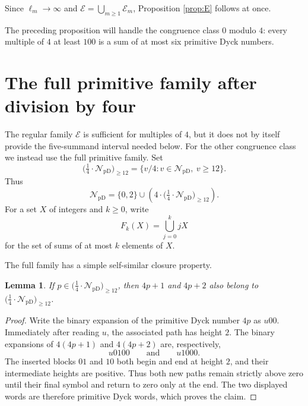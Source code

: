 \documentclass[12pt]{article}
\theoremstyle{plain}
\newtheorem{lemma}[theorem]{Lemma}
\newcommand{\NpD}{\mathcal{N}_{\mathrm{pD}}}
\newcommand{\Pset}{\bigl(\tfrac14\cdot
  \mathcal N_{\mathrm{pD}}\bigr)_{\ge 12}}
\begin{document}
Since $\ell_{m}\to\infty$ and $\mathcal E=\bigcup_{m\geq1}\mathcal E_{m}$,
Proposition \ref{prop:E} follows at once.

The preceding proposition will handle the congruence class $0$ modulo
$4$: every multiple of $4$ at least $100$ is a sum of at most six
primitive Dyck numbers.

\section{The full primitive family after division by four}

The regular family $\mathcal E$ is sufficient for multiples of $4$, but
it does not by itself provide the five-summand interval needed below.
For the other congruence class we instead use the full primitive family.
Set
\[
 \Pset=\{v/4:v\in\NpD,\ v\geq12\}.
\]
Thus
\[
 \NpD=\{0,2\}\cup(4\cdot\Pset).
\]
For a set $X$ of integers and $k\geq0$, write
\[
 F_k(X)=\bigcup_{j=0}^{k}jX
\]
for the set of sums of at most $k$ elements of $X$.

The full family has a simple self-similar closure property.

\begin{lemma}\label{lem:Pclosure}
If $p\in\Pset$, then $4p+1$ and $4p+2$ also belong to $\Pset$.
\end{lemma}

\begin{proof}
Write the binary expansion of the primitive Dyck number $4p$ as $u00$.
Immediately after reading $u$, the associated path has height $2$.  The
binary expansions of $4(4p+1)$ and $4(4p+2)$ are, respectively,
\[
 u0100\qquad\text{and}\qquad u1000.
\]
The inserted blocks $01$ and $10$ both begin and end at height $2$, and
their intermediate heights are positive.  Thus both new paths remain
strictly above zero until their final symbol and return to zero only at
the end.  The two displayed words are therefore primitive Dyck words,
which proves the claim.
\end{proof}
\end{document}
